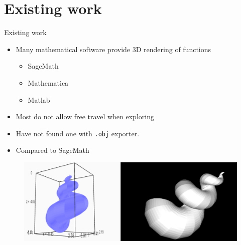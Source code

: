 \documentclass{beamer}
\begin{document}
\section{Existing work}
\begin{frame}{Existing work}
\begin{itemize}
\item Many mathematical software provide 3D rendering of functions
\begin{itemize}
\item SageMath
\item Mathematica
\item Matlab
\end{itemize}
\item Most do not allow free travel when exploring
\item Have not found one with \texttt{.obj} exporter.
\end{itemize}
\end{frame}
\begin{frame}
\begin{itemize}
\item Compared to SageMath
\end{itemize}
\begin{figure}
\includegraphics[scale=0.45]{existing.png}
\end{figure}
\end{frame}
\end{document}
